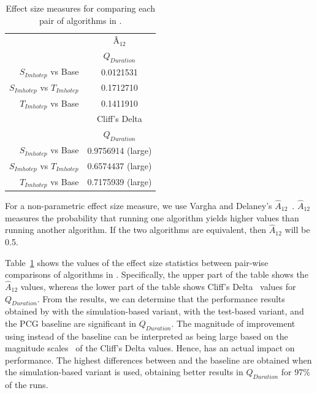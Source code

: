 \begin{table}[H]
\centering
\caption{Effect size measures for comparing each pair of algorithms in \CaseStudy{}.}
\label{tab:effectSize}
\begin{tabular}{@{}rc@{}}
\toprule
               & Â$_{12}$          \\ \cmidrule(l){2-2} 
               & $Q_{Duration}$    \\ \midrule
               $S_{Imhotep}$ vs Base  & 0.0121531         \\
$S_{Imhotep}$ vs $T_{Imhotep}$ & 0.1712710         \\
$T_{Imhotep}$ vs Base  & 0.1411910         \\ \midrule
               & Cliff's Delta     \\ \cmidrule(l){2-2} 
               & $Q_{Duration}$    \\ \midrule
               $S_{Imhotep}$ vs Base  & 0.9756914 (large) \\
$S_{Imhotep}$ vs $T_{Imhotep}$ & 0.6574437 (large) \\
$T_{Imhotep}$ vs Base  & 0.7175939 (large) \\ \bottomrule
\end{tabular}
\end{table}

For a non-parametric effect size measure, we use Vargha and Delaney's $\hat{A}_{12}$~\cite{Vargha2000,Grissom2005}. $\hat{A}_{12}$ measures the probability that running one algorithm yields higher values than running another algorithm. If the two algorithms are equivalent, then $\hat{A}_{12}$ will be 0.5.

Table~\ref{tab:effectSize} shows the values of the effect size statistics between pair-wise comparisons of algorithms in \CaseStudy{}. Specifically, the upper part of the table shows the $\hat{A}_{12}$ values, whereas the lower part of the table shows Cliff's Delta~\cite{Cliff1996} values for $Q_{Duration}$. From the results, we can determine that the performance results obtained by \ApproachName{} with the simulation-based variant, \ApproachName{} with the test-based variant, and the PCG baseline are significant in $Q_{Duration}$. The magnitude of improvement using \ApproachName{} instead of the baseline can be interpreted as being large based on the magnitude scales~\cite{Romano2006} of the Cliff's Delta values. Hence, \ApproachName{} has an actual impact on performance. The highest differences between \ApproachName{} and the baseline are obtained when the simulation-based variant is used, obtaining better results in $Q_{Duration}$ for 97\% of the runs.

